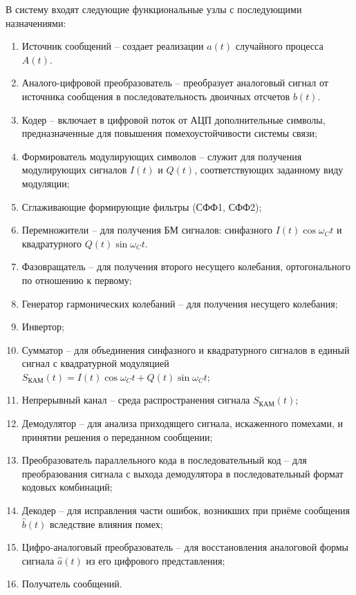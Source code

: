\documentclass[a4paper, 12pt]{article}
\begin{document}
В систему входят следующие функциональные узлы с последующими назначениями:
\begin{enumerate}
  \item Источник сообщений -- создает реализации $a(t)$ случайного
  процесса $A(t)$.
  \item Аналого-цифровой преобразователь -- преобразует аналоговый
  сигнал от источника сообщения в последовательность 
  двоичных отсчетов $b(t)$.
  \item Кодер -- включает в цифровой поток от АЦП дополнительные
  символы, предназначенные для повышения помехоустойчивости системы
  связи;
  \item Формирователь модулирующих символов -- служит для получения
  модулирующих сигналов $I(t)$ и $Q(t)$, соответствующих заданному
  виду модуляции;
  \item Сглаживающие формирующие фильтры (СФФ1, СФФ2);
  \item Перемножители -- для получения БМ сигналов: синфазного 
  $I(t)\cos{\omega_Ct}$ и квадратурного $Q(t)\sin{\omega_Ct}$.
  \item Фазовращатель -- для получения второго несущего колебания, 
  ортогонального по отношению к первому;
  \item Генератор гармонических колебаний -- для получения несущего  
  колебания;
  \item Инвертор;
  \item Сумматор -- для объединения синфазного и квадратурного 
  сигналов в единый сигнал с квадратурной модуляцией 
  $S_{КАМ}(t) = I(t)\cos{\omega_Ct} + Q(t)\sin{\omega_Ct}$;
  \item Непрерывный канал -- среда распространения сигнала 
  $S_{КАМ}(t)$;
  \item Демодулятор -- для анализа приходящего сигнала, 
  искаженного помехами, и принятии решения о переданном сообщении; 
  \item Преобразователь параллельного кода в последовательный код --
  для преобразования сигнала с выхода демодулятора в 
  последовательный формат кодовых комбинаций;
  \item Декодер -- для исправления части ошибок, возникших при приёме 
  сообщения $\hat{b}(t)$ вследствие влияния помех; 
  \item Цифро-аналоговый преобразователь -- для восстановления  
  аналоговой формы сигнала $\hat{a}(t)$ из его цифрового представления;
  \item Получатель сообщений.
\end{enumerate}
\end{document}
